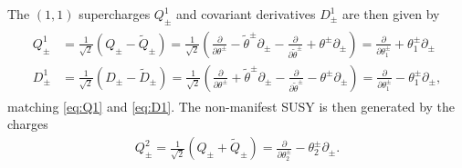 \documentclass{article}
\newcommand{\id}{\mathbbm{1}}
\newcommand{\p}{\partial}
\newcommand{\tth}{\tl{\theta}}
\def\tl{\tilde}
\theoremstyle{definition}
\theoremstyle{definition}
\theoremstyle{remark}
\begin{document}
The $(1,1)$ supercharges $Q_\pm^1$ and covariant derivatives $D_\pm^1$ are then given by
\begin{align}\label{eq:(2,2)to(1,1)}
\begin{aligned}
Q_\pm^1&=\frac{1}{\sqrt{2}}(Q_\pm-\tl{Q}_\pm)=\frac{1}{\sqrt{2}}(\frac{\p}{\p \theta^\pm}-\tth^\pm\p_\pm-\frac{\p}{\p \tth^\pm}+\theta^\pm\p_\pm)=\frac{\p}{\p \theta_1^\pm}+\theta^\pm_1\p_\pm\\
D_\pm^1&=\frac{1}{\sqrt{2}}(D_\pm-\tl{D}_\pm)=\frac{1}{\sqrt{2}}(\frac{\p}{\p \theta^\pm}+\tth^\pm\p_\pm-\frac{\p}{\p \tth^\pm}-\theta^\pm\p_\pm)=\frac{\p}{\p \theta_1^\pm}-\theta^\pm_1\p_\pm,
\end{aligned}
\end{align}
matching \eqref{eq:Q1} and \eqref{eq:D1}. The non-manifest SUSY is then generated by the charges
\begin{align}\label{eq:nonmanifest_susy_Ds}
Q_\pm^2=\frac{1}{\sqrt{2}}(Q_\pm+\tl{Q}_\pm)=\frac{\p}{\p \theta_2^\pm}-\theta^\pm_2\p_\pm.
\end{align}
%
\end{document}
